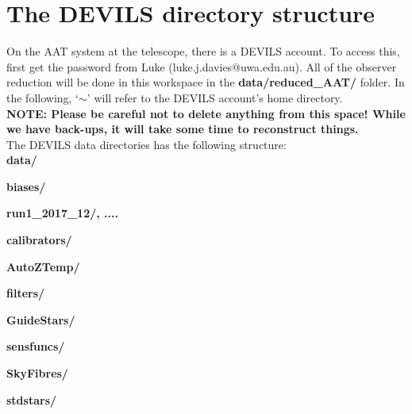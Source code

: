 \documentclass[12pt]{article}
\begin{document}
     
\section{The DEVILS directory structure}


On the AAT system at the telescope, there is a DEVILS account. To access this, first get the password from Luke (luke.j.davies@uwa.edu.au). All of the observer reduction will be done in this workspace in the \textbf{data/reduced\_AAT/} folder. In the following, `$\sim$' will refer to the DEVILS account's home directory.\\

\textcolor{PineGreen}{\textbf{NOTE: Please be careful not to delete anything from this space! While we have back-ups, it will take some time to reconstruct things.}}\\

The DEVILS data directories has the following structure:\\

\hspace{5mm} \textbf{data/} 
\vspace{1mm}

\hspace{10mm} \textbf{biases/}
\vspace{1mm}

\hspace{15mm} \textbf{run1\_2017\_12/, ....} 
\vspace{1mm}

\hspace{10mm} \textbf{calibrators/} 
\vspace{1mm}

\hspace{15mm} \textbf{AutoZTemp/} 
\vspace{1mm}

\hspace{15mm} \textbf{filters/} 
\vspace{1mm}

\hspace{15mm} \textbf{GuideStars/}
\vspace{1mm}

\hspace{15mm} \textbf{sensfuncs/}
\vspace{1mm}

\hspace{15mm} \textbf{SkyFibres/}
\vspace{1mm}

\hspace{15mm} \textbf{stdstars/}
\vspace{1mm}
\end{document}
